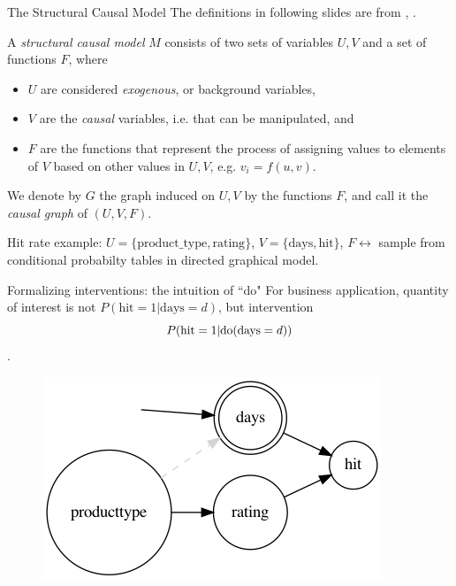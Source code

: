\begin{frame}{The Structural Causal Model}
    The definitions in following slides are from \cite{pearl2007mathematics}, \cite{pearl2016causal}.
    \begin{definition}
        A \emph{structural causal model} $M$ consists of two sets of variables $U, V$ and a set of functions $F$, where

        \begin{itemize}
            \item $U$ are considered \emph{exogenous}, or background variables,
            \item $V$ are the \emph{causal} variables, i.e. that can be manipulated, and
            \item $F$ are the functions that represent the process of assigning values to elements of $V$ based on other values in $U, V$, e.g. $v_i = f(u, v)$.
        \end{itemize}

        We denote by $G$ the graph induced on $U, V$ by the functions $F$, and call it the \emph{causal graph} of $(U, V, F)$.\newline
    \end{definition}

    Hit rate example: $U = \{\textrm{product\_type}, \textrm{rating}\}$, $V= \{\textrm{days}, \textrm{hit}\}$, $F\leftrightarrow$ sample from conditional probabilty tables in directed graphical model.
\end{frame}

\begin{frame}{Formalizing interventions: the intuition of ``do"}
    For business application, quantity of interest is not $P(\textrm{hit}=1 | \textrm{days}=d)$, but intervention $$P(\textrm{hit}=1 | \mathrm{do}(\textrm{days}=d))$$.\newline
    \begin{figure}[ht]
        \includegraphics[height=0.4\textwidth]{graphics/do_days}
    \end{figure}
\end{frame}

